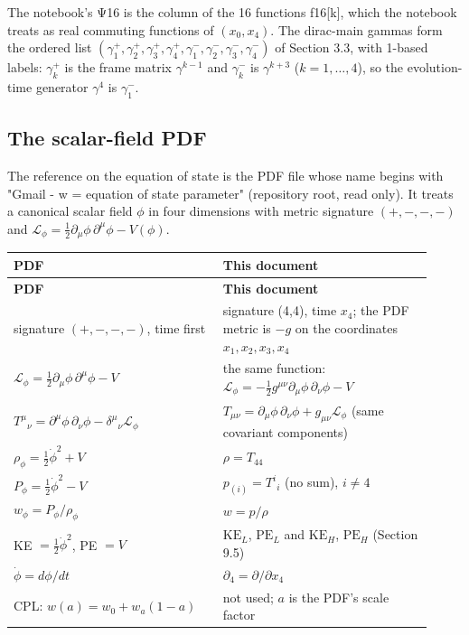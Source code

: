 \documentclass[11pt]{article}
\begin{document}
The notebook's Ψ16 is the column of the 16 functions f16[k], which the notebook treats as real commuting functions of $(x_0,x_4)$. The dirac-main gammas form the ordered list $(\gamma_1^+,\gamma_2^+,\gamma_3^+,\gamma_4^+,\gamma_1^-,\gamma_2^-,\gamma_3^-,\gamma_4^-)$ of Section 3.3, with 1-based labels: $\gamma_k^+$ is the frame matrix $\gamma^{k-1}$ and $\gamma_k^-$ is $\gamma^{k+3}$ ($k=1,\dots,4$), so the evolution-time generator $\gamma^4$ is $\gamma_1^-$.

\subsection{The scalar-field PDF}

The reference on the equation of state is the PDF file whose name begins with "Gmail - w = equation of state parameter" (repository root, read only). It treats a canonical scalar field $\phi$ in four dimensions with metric signature $(+,-,-,-)$ and $\mathcal L_\phi=\tfrac12\partial_\mu\phi\,\partial^\mu\phi-V(\phi)$.

\begin{longtable}{@{}p{0.460\linewidth}p{0.460\linewidth}@{}}
\toprule
\textbf{PDF} & \textbf{This document} \\
\midrule
\endfirsthead
\toprule
\textbf{PDF} & \textbf{This document} \\
\midrule
\endhead
signature $(+,-,-,-)$, time first & signature (4,4), time $x_4$; the PDF metric is $-g$ on the coordinates $x_1,x_2,x_3,x_4$ \\
$\mathcal L_\phi=\tfrac12\partial_\mu\phi\,\partial^\mu\phi-V$ & the same function: $\mathcal L_\phi=-\tfrac12g^{\mu\nu}\partial_\mu\phi\,\partial_\nu\phi-V$ \\
$T^\mu{}_\nu=\partial^\mu\phi\,\partial_\nu\phi-\delta^\mu{}_\nu\mathcal L_\phi$ & $T_{\mu\nu}=\partial_\mu\phi\,\partial_\nu\phi+g_{\mu\nu}\mathcal L_\phi$ (same covariant components) \\
$\rho_\phi=\tfrac12\dot\phi^2+V$ & $\rho=T_{44}$ \\
$P_\phi=\tfrac12\dot\phi^2-V$ & $p_{(i)}=T^i{}_i$ (no sum), $i\ne4$ \\
$w_\phi=P_\phi/\rho_\phi$ & $w=p/\rho$ \\
KE $=\tfrac12\dot\phi^2$, PE $=V$ & $\mathrm{KE}_L$, $\mathrm{PE}_L$ and $\mathrm{KE}_H$, $\mathrm{PE}_H$ (Section 9.5) \\
$\dot\phi=d\phi/dt$ & $\partial_4=\partial/\partial x_4$ \\
CPL: $w(a)=w_0+w_a(1-a)$ & not used; $a$ is the PDF's scale factor \\
\bottomrule
\end{longtable}
\end{document}
